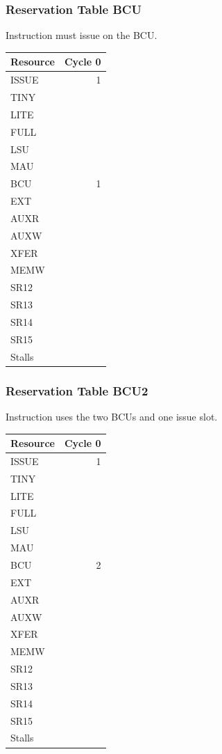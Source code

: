 \subsubsection{Reservation Table BCU} \label{sec:reservation-BCU}

Instruction must issue on the BCU.
\medskip

\begin{tabular}{|l|r|} \hline
Resource	& Cycle 0 \\ \hline
\textsf{ISSUE}	& 1	\\
\textsf{TINY}	& 	\\
\textsf{LITE}	& 	\\
\textsf{FULL}	& 	\\
\textsf{LSU}	& 	\\
\textsf{MAU}	& 	\\
\textsf{BCU}	& 1	\\
\textsf{EXT}	& 	\\
\textsf{AUXR}	& 	\\
\textsf{AUXW}	& 	\\
\textsf{XFER}	& 	\\
\textsf{MEMW}	& 	\\
\textsf{SR12}	& 	\\
\textsf{SR13}	& 	\\
\textsf{SR14}	& 	\\
\textsf{SR15}	& 	\\
\hline Stalls	& 	\\
\hline \end{tabular}

\subsubsection{Reservation Table BCU2} \label{sec:reservation-BCU2}

Instruction uses the two BCUs and one issue slot.
\medskip

\begin{tabular}{|l|r|} \hline
Resource	& Cycle 0 \\ \hline
\textsf{ISSUE}	& 1	\\
\textsf{TINY}	& 	\\
\textsf{LITE}	& 	\\
\textsf{FULL}	& 	\\
\textsf{LSU}	& 	\\
\textsf{MAU}	& 	\\
\textsf{BCU}	& 2	\\
\textsf{EXT}	& 	\\
\textsf{AUXR}	& 	\\
\textsf{AUXW}	& 	\\
\textsf{XFER}	& 	\\
\textsf{MEMW}	& 	\\
\textsf{SR12}	& 	\\
\textsf{SR13}	& 	\\
\textsf{SR14}	& 	\\
\textsf{SR15}	& 	\\
\hline Stalls	& 	\\
\hline \end{tabular}


